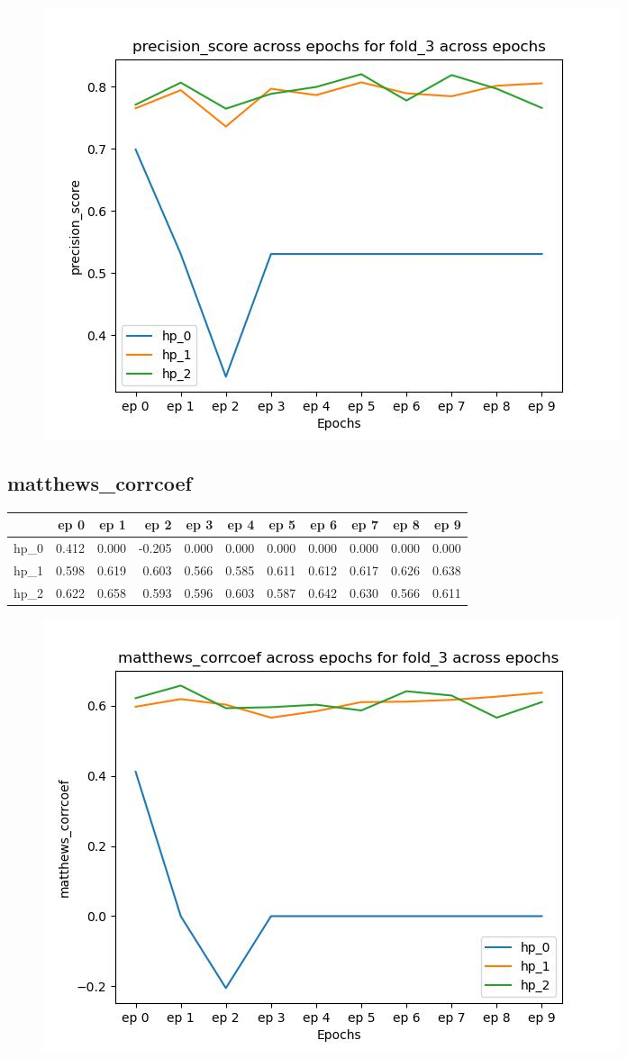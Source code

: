 \documentclass{article}
\begin{document}
\begin{figure}[H]
\includegraphics[scale = 0.75]{fold_3/precision_score}
\end{figure}
\subsection{matthews\_corrcoef}
\begin{tabular}{lrrrrrrrrrr}
\toprule
{} &   ep 0 &   ep 1 &   ep 2 &   ep 3 &   ep 4 &   ep 5 &   ep 6 &   ep 7 &   ep 8 &   ep 9 \\
\midrule
hp\_0 &  0.412 &  0.000 & -0.205 &  0.000 &  0.000 &  0.000 &  0.000 &  0.000 &  0.000 &  0.000 \\
hp\_1 &  0.598 &  0.619 &  0.603 &  0.566 &  0.585 &  0.611 &  0.612 &  0.617 &  0.626 &  0.638 \\
hp\_2 &  0.622 &  0.658 &  0.593 &  0.596 &  0.603 &  0.587 &  0.642 &  0.630 &  0.566 &  0.611 \\
\bottomrule
\end{tabular}

\begin{figure}[H]
\includegraphics[scale = 0.75]{fold_3/matthews_corrcoef}
\end{figure}
\end{document}
